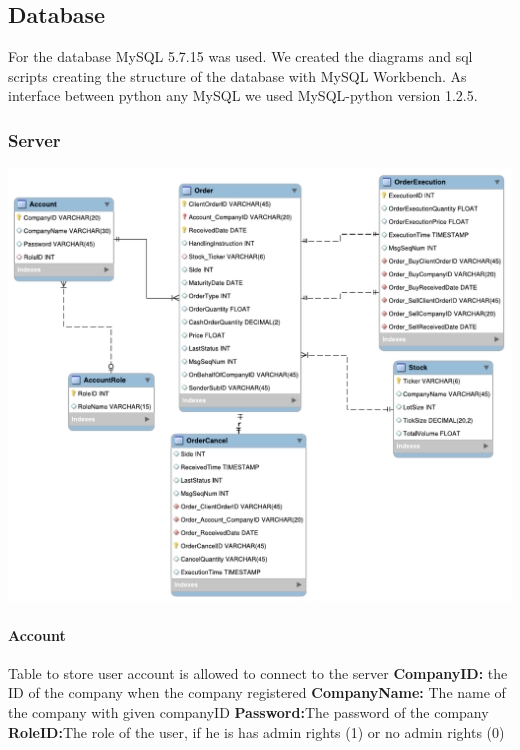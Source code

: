 \documentclass[a4paper, 11pt]{article}
\begin{document}
\subsection*{Database}

For the database MySQL 5.7.15 was used. We created the diagrams and sql scripts creating the structure of the database with MySQL Workbench.
As interface between python any MySQL we used MySQL-python version 1.2.5.
\subsubsection*{Server}
\includegraphics{../diagrams/server_database.pdf}

\paragraph*{Account}
Table to store user account is allowed to connect to the server
\textbf{CompanyID:} the ID of the company when the company registered
\textbf{CompanyName:} The name of the company with given companyID
\textbf{Password:}The password of the company
\textbf{RoleID:}The role of the user, if he is has admin rights (1) or no admin rights (0)
\end{document}
